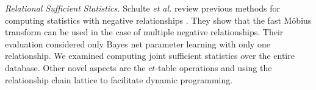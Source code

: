 \documentclass{acm_proc_article-sp}
\newcommand{\ct}{\mathit{ct}}
\begin{document}
{\em Relational Sufficient Statistics.} 
Schulte {\em et al.} review previous methods for computing statistics with negative relationships \cite{Schulte2014}. They show that the fast M\"obius transform can be used in the case of multiple negative relationships. 
Their evaluation considered only Bayes net parameter learning with only one relationship. 
We examined computing joint sufficient statistics over the entire database. 
Other novel aspects are the $\ct$-table operations and using the relationship chain lattice to facilitate dynamic programming. 


%
\end{document}
